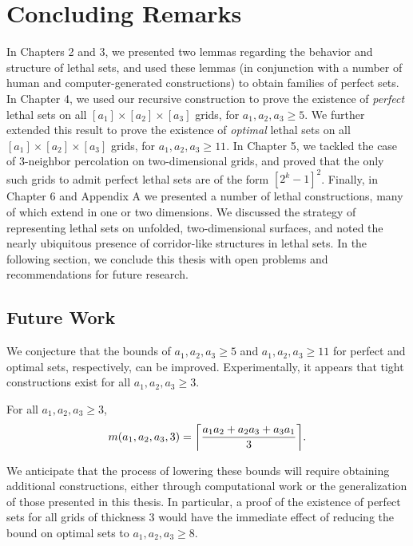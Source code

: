 \chapter{Concluding Remarks}

In Chapters 2 and 3, we presented two lemmas regarding the behavior and structure of lethal sets, and used these lemmas (in conjunction with a number of human and computer-generated constructions) to obtain families of perfect sets. In Chapter 4, we used our recursive construction to prove the existence of \emph{perfect} lethal sets on all $[a_1] \times [a_2] \times [a_3]$ grids, for $a_1,a_2,a_3 \geq 5$. We further extended this result to prove the existence of \emph{optimal} lethal sets on all $[a_1] \times [a_2] \times [a_3]$ grids, for $a_1,a_2,a_3 \geq 11$. In Chapter 5, we tackled the case of 3-neighbor percolation on two-dimensional grids, and proved that the only such grids to admit perfect lethal sets are of the form $[2^k-1]^2$. Finally, in Chapter 6 and Appendix A we presented a number of lethal constructions, many of which extend in one or two dimensions. We discussed the strategy of representing lethal sets on unfolded, two-dimensional surfaces, and noted the nearly ubiquitous presence of corridor-like structures in lethal sets. In the following section, we conclude this thesis with open problems and recommendations for future research.

\section{Future Work}

We conjecture that the bounds of $a_1, a_2,a_3 \geq 5$ and $a_1, a_2,a_3 \geq 11$ for perfect and optimal sets, respectively, can be improved. Experimentally, it appears that tight constructions exist for all $a_1, a_2,a_3 \geq 3$. 

\begin{conj}
\label{conj:better_bound}
For all $a_1, a_2,a_3 \geq 3$,
$$m(a_1,a_2,a_3,3) = \ceil*{\frac{a_1a_2 +a_2a_3+a_3a_1}{3}}.$$
\end{conj}
We anticipate that the process of lowering these bounds will require obtaining additional constructions, either through computational work or the generalization of those presented in this thesis. In particular, a proof of the existence of perfect sets for all grids of thickness 3 would have the immediate effect of reducing the bound on optimal sets to $a_1, a_2,a_3 \geq 8$. 

